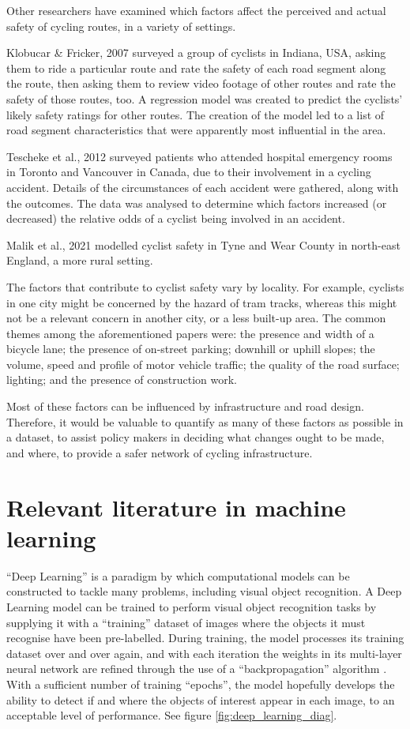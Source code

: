 \documentclass[11pt,twoside]{report}
\begin{document}
Other researchers have examined which factors affect the perceived and actual safety of cycling routes, in a variety of settings.

Klobucar \& Fricker, 2007 \cite{BIKESAFETY} surveyed a group of cyclists in Indiana, USA, asking them to ride a particular route and rate the safety of each road segment along the route, then asking them to review video footage of other routes and rate the safety of those routes, too.  A regression model was created to predict the cyclists' likely safety ratings for other routes.  The creation of the model led to a list of road segment characteristics that were apparently most influential in the area.

Tescheke et al., 2012 \cite{Teschke2012} surveyed patients who attended hospital emergency rooms in Toronto and Vancouver in Canada, due to their involvement in a cycling accident.  Details of the circumstances of each accident were gathered, along with the outcomes.  The data was analysed to determine which factors increased (or decreased) the relative odds of a cyclist being involved in an accident.

Malik et al., 2021 \cite{Malik2021} modelled cyclist safety in Tyne and Wear County in north-east England, a more rural setting.

The factors that contribute to cyclist safety vary by locality.  For example, cyclists in one city might be concerned by the hazard of tram tracks, whereas this might not be a relevant concern in another city, or a less built-up area.  The common themes among the aforementioned papers were: the presence and width of a bicycle lane; the presence of on-street parking; downhill or uphill slopes; the volume, speed and profile of motor vehicle traffic; the quality of the road surface; lighting; and the presence of construction work.

Most of these factors can be influenced by infrastructure and road design.  Therefore, it would be valuable to quantify as many of these factors as possible in a dataset, to assist policy makers in deciding what changes ought to be made, and where, to provide a safer network of cycling infrastructure.

\section{Relevant literature in machine learning}

``Deep Learning'' is a paradigm by which computational models can be constructed to tackle many problems, including visual object recognition.  A Deep Learning model can be trained to perform visual object recognition tasks by supplying it with a ``training'' dataset of images where the objects it must recognise have been pre-labelled.  During training, the model processes its training dataset over and over again, and with each iteration the weights in its multi-layer neural network are refined through the use of a ``backpropagation'' algorithm \cite{deeplearning}.  With a sufficient number of training ``epochs'', the model hopefully develops the ability to detect if and where the objects of interest appear in each image, to an acceptable level of performance.  See figure \ref{fig:deep_learning_diag}.
\end{document}
